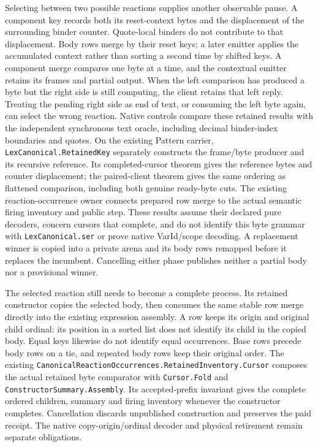 \documentclass[11pt]{article}
\theoremstyle{definition}
\theoremstyle{remark}
\begin{document}
\begin{enumerate}
Selecting between two possible reactions supplies another observable pause.
A component key records both its reset-context bytes and the displacement
of the surrounding binder counter. Quote-local binders do not contribute
to that displacement. Body rows merge by their reset keys; a later emitter
applies the accumulated context rather than sorting a second time by
shifted keys. A component merge compares one byte at a time, and the
contextual emitter retains its frames and partial output. When the left
comparison has produced a byte but the right side is still computing, the
client retains that left reply. Treating the pending right side as end of
text, or consuming the left byte again, can select the wrong reaction.
Native controls compare these retained results with the independent
synchronous text oracle, including decimal binder-index boundaries and
quotes. On the existing Pattern carrier,
\nolinkurl{LexCanonical.RetainedKey} separately constructs the frame/byte
producer and its recursive reference. Its completed-cursor theorem gives
the reference bytes and counter displacement; the paired-client theorem
gives the same ordering as flattened comparison, including both genuine
ready-byte cuts. The existing reaction-occurrence owner connects prepared
row merge to the actual semantic firing inventory and public step.
These results assume their declared pure decoders, concern cursors that
complete, and do not identify this byte grammar with
\nolinkurl{LexCanonical.ser} or prove native VarId/scope decoding.
A replacement winner is copied into a private arena and its body
rows remapped before it replaces the incumbent. Cancelling either phase
publishes neither a partial body nor a provisional winner.

The selected reaction still needs to become a complete process. Its retained
constructor copies the selected body, then consumes the same stable row merge
directly into the existing expression assembly. A row keeps its origin and
original child ordinal: its position in a sorted list does not identify its
child in the copied body. Equal keys likewise do not identify equal
occurrences. Base rows precede body rows on a tie, and repeated body rows keep
their original order. The existing
\nolinkurl{CanonicalReactionOccurrences.RetainedInventory.Cursor} composes the
actual retained byte comparator with \nolinkurl{Cursor.Fold} and
\nolinkurl{ConstructorSummary.Assembly}. Its accepted-prefix invariant gives
the complete ordered children, summary and firing inventory whenever the
constructor completes. Cancellation discards unpublished construction and
preserves the paid receipt. The native copy-origin/ordinal decoder and
physical retirement remain separate obligations.


\end{enumerate}
\end{document}
